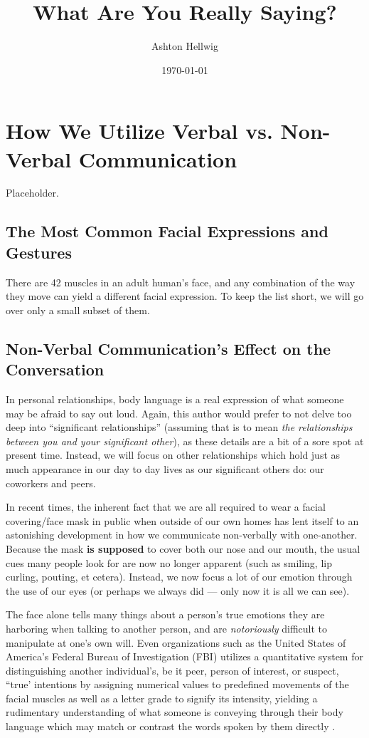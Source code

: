 \documentclass[stu,12pt]{apa7}
\title{%
    What Are You Really Saying?
  }
\author{Ashton Hellwig}
\date{\today}
\begin{document}
  \maketitle

  \section{How We Utilize Verbal vs. Non-Verbal Communication}
    Placeholder.

    \subsection{The Most Common Facial Expressions and Gestures}
      There are 42 muscles in an adult human's face, and any combination of
        the way they move can yield a different facial expression. To keep the
        list short, we will go over only a small subset of them.

    \subsection{Non-Verbal Communication's Effect on the Conversation}
      In personal relationships, body language is a real expression of what
        someone may be afraid to say out loud. Again, this author would prefer
        to not delve too deep into ``significant relationships'' (assuming
        that is to mean \textit{the relationships between you and your
        significant other}), as these details are a bit of a sore spot at
        present time. Instead, we will focus on other relationships which hold
        just as much appearance in our day to day lives as our significant
        others do: our coworkers and peers.

      In recent times, the inherent fact that we are all required to wear a
        facial covering/face mask in public when outside of our own homes has
        lent itself to an astonishing development in how we communicate
        non-verbally with one-another. Because the mask \textbf{is supposed}
        to cover both our nose and our mouth, the usual cues many people look
        for are now no longer apparent (such as smiling, lip curling, pouting,
        et cetera). Instead, we now focus a lot of our emotion through the use
        of our eyes (or perhaps we always did --- only now it is all we can
        see).

      The face alone tells many things about a person's true emotions they are
        harboring when talking to another person, and are \textit{notoriously}
        difficult to manipulate at one's own will. Even organizations such as
        the United States of America's Federal Bureau of Investigation (FBI)
        utilizes a quantitative system for distinguishing another individual's,
        be it peer, person of interest, or suspect, ``true' intentions by
        assigning numerical values to predefined movements of the facial muscles
        as well as a letter grade to signify its intensity, yielding a
        rudimentary understanding of what someone is conveying through their
        body language which may match or contrast the words spoken by them
        directly \parencite[pp. 209]{cohn_observer-based_2007}.
\end{document}
